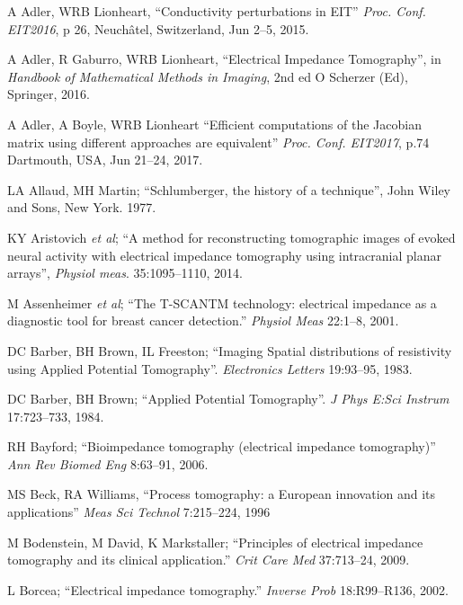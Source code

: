 \documentclass[12pt]{article} \usepackage[margin=3cm]{geometry} \usepackage[margin=20pt,font=small,labelfont=bf]{caption}\def\TBLWIDA{35mm}\def\TBLWIDB{95mm}
\newcommand{\ifmaxthree}[2]{#2 {\em et al}; }
\begin{document}
\begin{thebibliography}{00}
A Adler, WRB Lionheart,
``Conductivity perturbations in EIT''
{\em Proc. Conf. EIT2016}, p 26, Neuchâtel, Switzerland, Jun 2--5, 2015.

A Adler, R Gaburro, WRB Lionheart,
``Electrical Impedance Tomography'',
 in {\em Handbook of Mathematical Methods in Imaging}, 2nd ed 
O Scherzer (Ed), Springer, 2016.

A Adler, A Boyle, WRB Lionheart
``Efficient computations of the Jacobian matrix using different approaches are equivalent''
{\em Proc. Conf. EIT2017}, p.74 Dartmouth, USA, Jun 21--24, 2017.

LA Allaud, MH Martin; 
``Schlumberger, the history of a technique'',
John Wiley and Sons, New York. 1977.

\ifmaxthree{
KY Aristovich, GS dos Santos, BC Packham, DS Holder. 
}{
KY Aristovich
}
``A method for reconstructing tomographic images of evoked neural activity with electrical impedance tomography using intracranial planar arrays'',
{\em Physiol meas}. 35:1095--1110, 2014.

\ifmaxthree{
M Assenheimer, O Laver-Moskovitz, D Malonek, D Manor, U Nahaliel, R Nitzan, A Saad
}{
M Assenheimer
}
``The T-SCANTM technology: electrical impedance as a diagnostic tool for breast cancer detection.''
{\em Physiol Meas} 22:1--8, 2001. %

DC Barber, BH Brown, IL Freeston;
``Imaging Spatial distributions of resistivity using Applied Potential Tomography''.
{\em Electronics Letters} 19:93--95, 1983.

DC Barber, BH Brown;
``Applied Potential Tomography''.
{\em  J Phys E:Sci Instrum} 17:723--733, 1984.

RH Bayford; 
``Bioimpedance tomography (electrical impedance tomography)''
{\em Ann Rev Biomed Eng} 8:63--91, 2006.

MS Beck, RA Williams,
``Process tomography: a European innovation and its applications''
{\em Meas Sci Technol} 7:215--224, 1996

M Bodenstein, M David, K Markstaller;
``Principles of electrical impedance tomography and its clinical application.''
{\em Crit Care Med} 37:713--24, 2009.

L Borcea;
``Electrical impedance tomography.''
{\em  Inverse Prob} 18:R99--R136, 2002.


\end{thebibliography}
\end{document}
